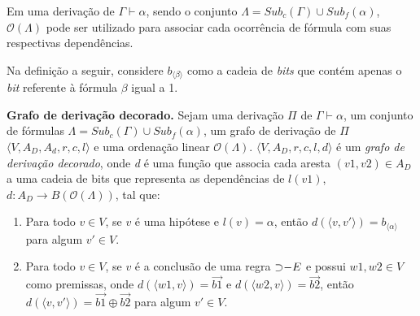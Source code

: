 Em uma derivação de $\Gamma \vdash \alpha$, sendo o conjunto $\Lambda = Sub
_{c}(\Gamma) \cup Sub_{f}(\alpha)$, $\mathcal{O}(\Lambda)$ pode ser utilizado para associar cada ocorrência de fórmula com suas respectivas dependências.

Na definição a seguir, considere $b_{\langle \beta \rangle}$ como a cadeia de \textit{bits} que contém apenas o \textit{bit} referente à fórmula $\beta$ igual a 1.

\vspace{3mm}

\begin{definition}{\textbf{Grafo de derivação decorado.}}
Sejam uma derivação $\Pi$ de $\Gamma \vdash \alpha$, um conjunto de fórmulas $\Lambda = Sub_{c}(\Gamma) \cup Sub_{f}(\alpha)$, um grafo de derivação de $\Pi$ $\langle V, A_D, A_d, r, c, l\rangle$ e uma ordenação linear $\mathcal{O}(\Lambda)$. $\langle V, A_D, r, c, l, d \rangle$ é um \textit{grafo de derivação decorado}, onde \textit{d} é uma função que associa cada aresta $(v1, v2) \in A_D$ a uma cadeia de bits que representa as dependências de $l(v1)$, $d: A_D \rightarrow B(\mathcal{O}(\Lambda))$, tal que:

\begin{enumerate}
    \item Para todo $v \in V$, se $v$ é uma hipótese e $l(v) = \alpha$, então $d(\langle v, v' \rangle) = b_{\langle \alpha \rangle}$ para algum $v' \in V$.
    
    \begin{center}
    \end{center}
    
    \item Para todo $v \in V$, se $v$ é a conclusão de uma regra $\mathord{\supset}{-E}$ e possui $w1, w2 \in V$ como premissas, onde $d(\langle w1, v \rangle) = \overrightarrow{b1}$ e $d(\langle w2, v \rangle) = \overrightarrow{b2}$, então $d(\langle v, v' \rangle) = \overrightarrow{b1} \oplus \overrightarrow{b2}$ para algum $v' \in V$.
    

\end{enumerate}
\end{definition}
